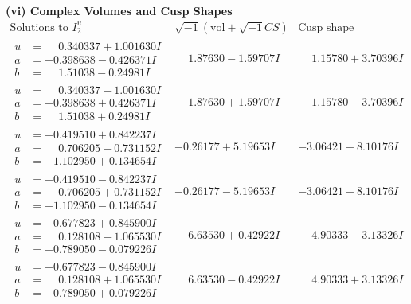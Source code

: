 \documentclass[1p]{elsarticle_modified}
\theoremstyle{definition}
\newcommand{\I}{\sqrt{-1}}
\begin{document}
\newpage\flushleft \textbf{(vi) Complex Volumes and Cusp Shapes}
$$\begin{array}{c|c|c}  
\text{Solutions to }I^u_{2}& \I (\text{vol} + \sqrt{-1}CS) & \text{Cusp shape}\\
 \hline 
\begin{aligned}
u &= \phantom{-}0.340337 + 1.001630 I \\
a &= -0.398638 - 0.426371 I \\
b &= \phantom{-}1.51038 - 0.24981 I\end{aligned}
 & \phantom{-}1.87630 - 1.59707 I & \phantom{-}1.15780 + 3.70396 I \\ \hline\begin{aligned}
u &= \phantom{-}0.340337 - 1.001630 I \\
a &= -0.398638 + 0.426371 I \\
b &= \phantom{-}1.51038 + 0.24981 I\end{aligned}
 & \phantom{-}1.87630 + 1.59707 I & \phantom{-}1.15780 - 3.70396 I \\ \hline\begin{aligned}
u &= -0.419510 + 0.842237 I \\
a &= \phantom{-}0.706205 - 0.731152 I \\
b &= -1.102950 + 0.134654 I\end{aligned}
 & -0.26177 + 5.19653 I & -3.06421 - 8.10176 I \\ \hline\begin{aligned}
u &= -0.419510 - 0.842237 I \\
a &= \phantom{-}0.706205 + 0.731152 I \\
b &= -1.102950 - 0.134654 I\end{aligned}
 & -0.26177 - 5.19653 I & -3.06421 + 8.10176 I \\ \hline\begin{aligned}
u &= -0.677823 + 0.845900 I \\
a &= \phantom{-}0.128108 - 1.065530 I \\
b &= -0.789050 - 0.079226 I\end{aligned}
 & \phantom{-}6.63530 + 0.42922 I & \phantom{-}4.90333 - 3.13326 I \\ \hline\begin{aligned}
u &= -0.677823 - 0.845900 I \\
a &= \phantom{-}0.128108 + 1.065530 I \\
b &= -0.789050 + 0.079226 I\end{aligned}
 & \phantom{-}6.63530 - 0.42922 I & \phantom{-}4.90333 + 3.13326 I \\ \hline\begin{aligned}

\end{aligned}
\end{array}$$
\end{document}
